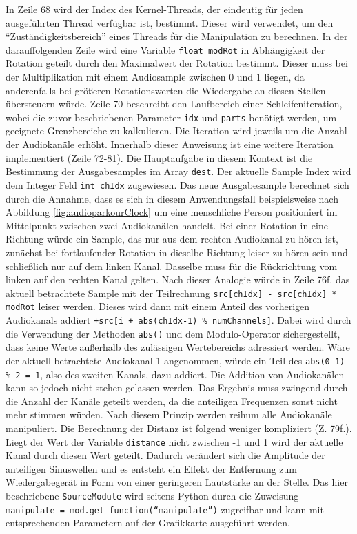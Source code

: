 In Zeile 68 wird der Index des Kernel-Threads, der eindeutig für jeden ausgeführten Thread verfügbar ist, bestimmt. Dieser wird verwendet, um den \enquote{Zuständigkeitsbereich} eines Threads für die Manipulation zu berechnen. In der darauffolgenden Zeile wird eine Variable \texttt{float modRot} in Abhängigkeit der Rotation geteilt durch den Maximalwert der Rotation bestimmt. Dieser muss bei der Multiplikation mit einem Audiosample zwischen 0 und 1 liegen, da anderenfalls bei größeren Rotationswerten die Wiedergabe an diesen Stellen übersteuern würde.
Zeile 70 beschreibt den Laufbereich einer Schleifeniteration, wobei die zuvor beschriebenen Parameter \texttt{idx} und \texttt{parts} benötigt werden, um geeignete Grenzbereiche zu kalkulieren. Die Iteration wird jeweils um die Anzahl der Audiokanäle erhöht.
Innerhalb dieser Anweisung ist eine weitere Iteration implementiert (Zeile 72-81). Die Hauptaufgabe in diesem Kontext ist die Bestimmung der Ausgabesamples im Array \texttt{dest}. Der aktuelle Sample Index wird dem Integer Feld \texttt{int chIdx} zugewiesen. Das neue Ausgabesample berechnet sich durch die Annahme, dass es sich in diesem Anwendungsfall beispielsweise nach Abbildung \ref{fig:audioparkourClock} um eine menschliche Person positioniert im Mittelpunkt zwischen zwei Audiokanälen handelt. Bei einer Rotation in eine Richtung würde ein Sample, das nur aus dem rechten Audiokanal zu hören ist, zunächst bei fortlaufender Rotation in dieselbe Richtung leiser zu hören sein und schließlich nur auf dem linken Kanal. Dasselbe muss für die Rückrichtung vom linken auf den rechten Kanal gelten. Nach dieser Analogie würde in Zeile 76f. das aktuell betrachtete Sample mit der Teilrechnung \texttt{src[chIdx] - src[chIdx] * modRot} leiser werden. Dieses wird dann mit einem Anteil des vorherigen Audiokanals addiert \texttt{+src[i + abs(chIdx-1) \% numChannels]}. Dabei wird durch die Verwendung der Methoden \texttt{abs()} und dem Modulo-Operator sichergestellt, dass keine Werte außerhalb des zulässigen Wertebereichs adressiert werden. Wäre der aktuell betrachtete Audiokanal 1 angenommen, würde ein Teil des \texttt{abs(0-1) \% 2 = 1}, also des zweiten Kanals, dazu addiert. Die Addition von Audiokanälen kann so jedoch nicht stehen gelassen werden. Das Ergebnis muss zwingend durch die Anzahl der Kanäle geteilt werden, da die anteiligen Frequenzen sonst nicht mehr stimmen würden. Nach diesem Prinzip werden reihum alle Audiokanäle manipuliert. Die Berechnung der Distanz ist folgend weniger kompliziert (Z. 79f.). Liegt der Wert der Variable \texttt{distance} nicht zwischen -1 und 1 wird der aktuelle Kanal durch diesen Wert geteilt. Dadurch verändert sich die Amplitude der anteiligen Sinuswellen und es entsteht ein Effekt der Entfernung zum Wiedergabegerät in Form von einer geringeren Lautstärke an der Stelle.
\newpage
Das hier beschriebene \texttt{SourceModule} wird seitens Python durch die Zuweisung \\ \texttt{manipulate = mod.get\_function(\enquote{manipulate})} zugreifbar und kann mit entsprechenden Parametern auf der Grafikkarte ausgeführt werden.

